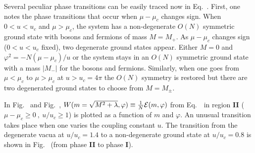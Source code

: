 
%

Several peculiar phase transitions can be easily traced now in
Eq.~\HartreeVTzeroE{}. First, one notes the phase transitions that
occur  when $\mu-\mu_c$ changes sign. When  $ 0 < u <u_c  $
and $\mu > \mu_c$, the system has a non-degenerate $O(N)$ symmetric
ground state with bosons and fermions of mass $M=M_+$. As $\mu -
\mu_c$ changes sign ($0 < u <u_c$ fixed), two degenerate ground
states appear. Either $M=0$ and $\varphi^2=-N(\mu-\mu_c)/u$ or the
system stays in an $O(N)$ symmetric ground state with a mass $|M_-|$
for the bosons and fermions. Similarly, when one goes from $\mu <
\mu_c$ to $\mu > \mu_c$ at $ u>u_c= 4\pi  $ the $O(N)$ symmetry is restored but there are two
degenerated ground states to choose from  $M=M_\pm$.


 In Fig.~\label{\figTIIaaa} and
 Fig.~\label{\ZeroTone}, $W(m=\sqrt{M^2+\lambda },\varphi) \equiv {1\over N}
{\cal E}(m, \varphi)$ from Eq.~\HartreeVTzeroF\ in region {\bf II}
($\mu-\mu_c \geq 0 ~,~ u/u_c \geq 1$) is plotted as a function of
$m$ and $\varphi$.  An unusual transition takes place when one
varies the coupling constant $u$. The transition from the
degenerate vacua at $u/u_c =1.4$ to a non-degenerate  ground state
at $u/u_c= 0.8$ is shown in Fig.~\label{\ZeroTtwo}  (from phase
{\bf II} to phase {\bf I}).


\midinsert \vskip -4.5cm \epsfxsize=15.5cm \epsfysize=10cm
 \hskip 1.7cm   \figlbl\ZeroTtwo

